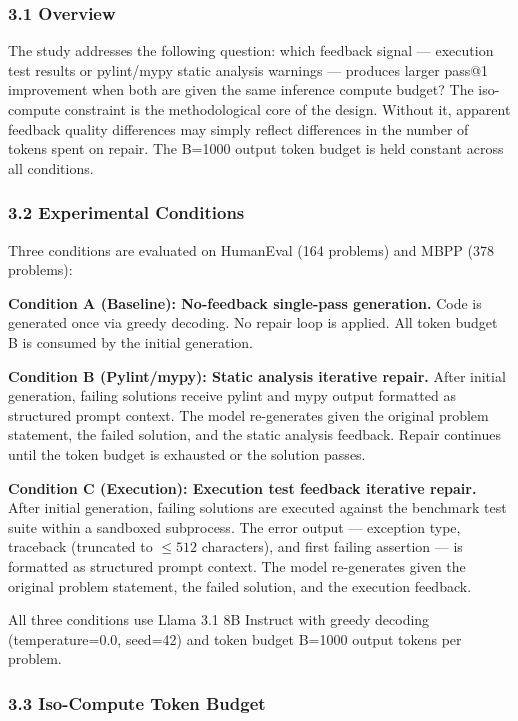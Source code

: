 
\subsubsection{3.1 Overview}

The study addresses the following question: which feedback signal --- execution test results or pylint/mypy static analysis warnings --- produces larger pass@1 improvement when both are given the same inference compute budget? The iso-compute constraint is the methodological core of the design. Without it, apparent feedback quality differences may simply reflect differences in the number of tokens spent on repair. The B=1000 output token budget is held constant across all conditions.

\subsubsection{3.2 Experimental Conditions}

Three conditions are evaluated on HumanEval (164 problems) and MBPP (378 problems):

\textbf{Condition A (Baseline): No-feedback single-pass generation.} Code is generated once via greedy decoding. No repair loop is applied. All token budget B is consumed by the initial generation.

\textbf{Condition B (Pylint/mypy): Static analysis iterative repair.} After initial generation, failing solutions receive pylint and mypy output formatted as structured prompt context. The model re-generates given the original problem statement, the failed solution, and the static analysis feedback. Repair continues until the token budget is exhausted or the solution passes.

\textbf{Condition C (Execution): Execution test feedback iterative repair.} After initial generation, failing solutions are executed against the benchmark test suite within a sandboxed subprocess. The error output --- exception type, traceback (truncated to $\leq 512$ characters), and first failing assertion --- is formatted as structured prompt context. The model re-generates given the original problem statement, the failed solution, and the execution feedback.

All three conditions use Llama 3.1 8B Instruct with greedy decoding (temperature=0.0, seed=42) and token budget B=1000 output tokens per problem.

\subsubsection{3.3 Iso-Compute Token Budget}

